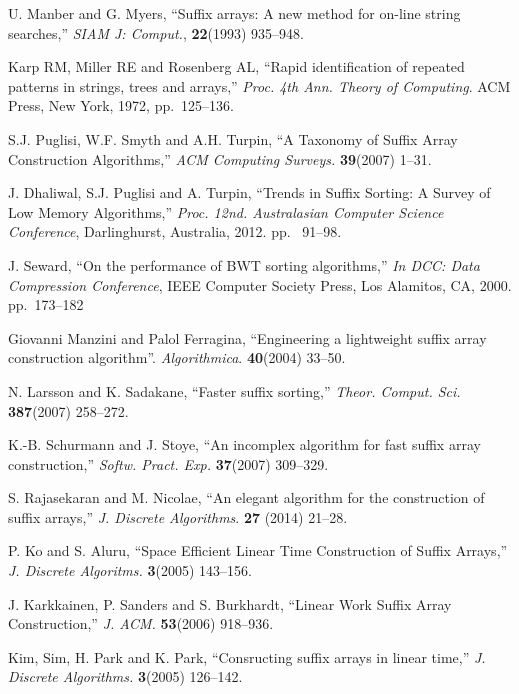 \documentclass{ws-ijprai}
\begin{document}
\begin{thebibliography}{99}

 U. Manber and G. Myers, ``Suffix arrays: A new method
for on-line string searches,'' {\it SIAM J: Comput.}, {\bf 22}(1993)
935--948.

 Karp RM, Miller RE and Rosenberg AL, ``Rapid
identification of repeated patterns in strings, trees and arrays,''
{\it Proc. 4th Ann. Theory of Computing}. ACM Press, New York, 1972,
pp.~125--136.

 S.J. Puglisi, W.F. Smyth and A.H. Turpin, ``A
Taxonomy of Suffix Array Construction Algorithms,'' {\it ACM Computing
Surveys.} {\bf 39}(2007) 1--31.

 J. Dhaliwal, S.J. Puglisi and A. Turpin, ``Trends in
Suffix Sorting: A Survey of Low Memory Algorithms,'' {\it
Proc. 12nd. Australasian Computer Science Conference}, Darlinghurst,
Australia, 2012. pp. ~91--98.

 J. Seward, ``On the performance of BWT sorting
algorithms,'' {\it In DCC: Data Compression Conference}, IEEE Computer
Society Press, Los Alamitos, CA, 2000.  pp.~173--182

 Giovanni Manzini and Palol Ferragina,
``Engineering a lightweight suffix array construction
algorithm''. {\it Algorithmica}. {\bf 40}(2004) 33--50.

 N. Larsson and K. Sadakane, ``Faster suffix
sorting,'' {\it Theor. Comput. Sci.} {\bf 387}(2007) 258--272.

 K.-B. Schurmann and J. Stoye, ``An incomplex algorithm
for fast suffix array construction,'' {\it Softw. Pract. Exp.}  {\bf
37}(2007) 309--329.

 S. Rajasekaran and M. Nicolae, ``An elegant
algorithm for the construction of suffix arrays,'' {\it J.  Discrete
Algorithms}. {\bf 27} (2014) 21--28.

 P. Ko and S. Aluru, ``Space Efficient Linear Time
Construction of Suffix Arrays,'' {\it J. Discrete Algoritms.} {\bf
3}(2005) 143--156.

 J. Karkkainen, P. Sanders and S. Burkhardt, ``Linear Work
Suffix Array Construction,'' {\it J. ACM.} {\bf 53}(2006) 918--936.

 Kim, Sim, H. Park and K. Park, ``Consructing suffix
arrays in linear time,'' {\it J. Discrete Algorithms.} {\bf 3}(2005)
126--142.


\end{thebibliography}
\end{document}
